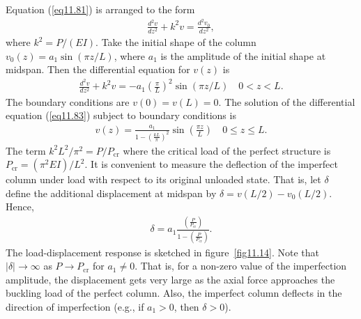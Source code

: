 \documentclass{AeroStructure-ERJohnson}
\begin{document}
\noindent Equation (\ref{eq11.81}) is arranged to the form
\begin{align}\label{eq11.82}
\frac{d^{2} v}{d z^{2}}+k^{2} v=\frac{d^{2} v_{0}}{d z^{2}},
\end{align}
where $k^{2}=P /(E I)$. Take the initial shape of the column $v_{0}(z)=a_{1} \sin (\pi z/L)$, where $a_1$ is the amplitude of the initial shape at midspan. Then the differential equation for $v(z)$ is
\begin{align}\label{eq11.83}
\frac{d^{2} v}{d z^{2}}+k^{2} v=-a_{1}\left(\frac{\pi}{L}\right)^{2} \sin (\pi z/L) \quad 0<z<L.
\end{align}
The boundary conditions are $v(0)=v(L)=0$. The solution of the differential equation (\ref{eq11.83}) subject to boundary conditions is
\begin{align}\label{eq11.84}
v(z)=\frac{a_{1}}{1-\left(\frac{k L}{\pi}\right)^{2}} \sin \left(\frac{\pi z}{L}\right) \quad 0 \leq z \leq L.
\end{align}
The term $k^{2} L^{2}/\pi^{2}=P/P_{\mathrm{cr}}$ where the critical load of the perfect structure is $P_{\mathrm{cr}}=\left(\pi^{2} E I\right)/L^{2}$. It is convenient to measure the deflection of the imperfect column under load with respect to its original unloaded state. That is, let $\delta$ define the additional displacement at midspan by $\delta=v(L/2)-v_{0}(L/2)$. Hence,
\begin{align}\label{eq11.85}
\delta=a_{1} \frac{\left(\frac{P}{P_{\textrm{cr}}}\right)}{1-\left(\frac{P}{P_{\textrm{cr}}}\right)}.
\end{align}
The load-displacement response is sketched in figure~\ref{fig11.14}. Note that $|\delta| \rightarrow \infty$ as $P \rightarrow P_{\mathrm{cr}}$ for $a_{1} \neq 0$. That is, for a non-zero value of the imperfection amplitude, the displacement gets very large as the axial force approaches the buckling load of the perfect column. Also, the imperfect column deflects in the direction of imperfection (e.g., if $a_{1}>0$, then $\delta>0$).

\end{document}
